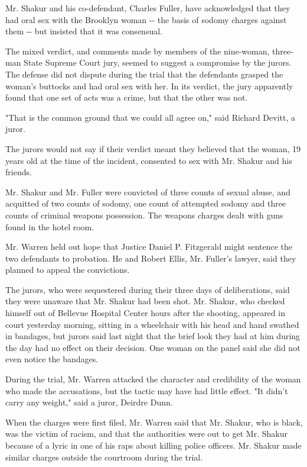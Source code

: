 Mr. Shakur and his co-defendant, Charles Fuller, have acknowledged that
they had oral sex with the Brooklyn woman -\/- the basis of sodomy
charges against them -\/- but insisted that it was consensual.

The mixed verdict, and comments made by members of the nine-woman,
three-man State Supreme Court jury, seemed to suggest a compromise by
the jurors. The defense did not dispute during the trial that the
defendants grasped the woman's buttocks and had oral sex with her. In
its verdict, the jury apparently found that one set of acts was a crime,
but that the other was not.

"That is the common ground that we could all agree on," said Richard
Devitt, a juror.

The jurors would not say if their verdict meant they believed that the
woman, 19 years old at the time of the incident, consented to sex with
Mr. Shakur and his friends.

Mr. Shakur and Mr. Fuller were convicted of three counts of sexual
abuse, and acquitted of two counts of sodomy, one count of attempted
sodomy and three counts of criminal weapons possession. The weapons
charges dealt with guns found in the hotel room.

Mr. Warren held out hope that Justice Daniel P. Fitzgerald might
sentence the two defendants to probation. He and Robert Ellis, Mr.
Fuller's lawyer, said they planned to appeal the convictions.

The jurors, who were sequestered during their three days of
deliberations, said they were unaware that Mr. Shakur had been shot. Mr.
Shakur, who checked himself out of Bellevue Hospital Center hours after
the shooting, appeared in court yesterday morning, sitting in a
wheelchair with his head and hand swathed in bandages, but jurors said
last night that the brief look they had at him during the day had no
effect on their decision. One woman on the panel said she did not even
notice the bandages.

During the trial, Mr. Warren attacked the character and credibility of
the woman who made the accusations, but the tactic may have had little
effect. "It didn't carry any weight," said a juror, Deirdre Dunn.

When the charges were first filed, Mr. Warren said that Mr. Shakur, who
is black, was the victim of racism, and that the authorities were out to
get Mr. Shakur because of a lyric in one of his raps about killing
police officers. Mr. Shakur made similar charges outside the courtroom
during the trial.

